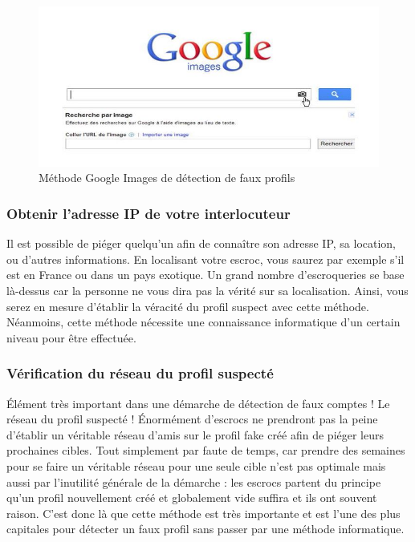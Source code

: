 \documentclass[12pt]{report}
\begin{document}
\begin{figure}[h]
\begin{center}
    \includegraphics[width=150mm]{google-image-recherche.jpg}
    \end{center}
    \caption{Méthode Google Images de détection de faux profils}
\label{fig:Méthode Google Images de détection de faux profils}
  \end{figure}

\subsubsection{Obtenir l’adresse IP de votre interlocuteur}
Il est possible de piéger quelqu'un afin de connaître son adresse IP, sa location, ou d'autres informations. En localisant votre escroc, vous saurez par exemple s’il est en France ou dans un pays exotique. Un grand nombre d'escroqueries se base là-dessus car la personne ne vous dira pas la vérité sur sa localisation. Ainsi, vous serez en mesure d'établir la véracité du profil suspect avec cette méthode. Néanmoins, cette méthode nécessite une connaissance informatique d'un certain niveau pour être effectuée. 

\subsubsection{Vérification du réseau du profil suspecté}
Élément très important dans une démarche de détection de faux comptes ! Le réseau du profil suspecté ! Énormément d'escrocs ne prendront pas la peine d'établir un véritable réseau d'amis sur le profil fake créé afin de piéger leurs prochaines cibles. Tout simplement par faute de temps, car prendre des semaines pour se faire un véritable réseau pour une seule cible n'est pas optimale mais aussi par l'inutilité générale de la démarche : les escrocs partent du principe qu'un profil nouvellement créé et globalement vide suffira et ils ont souvent raison. C'est donc là que cette méthode est très importante et est l'une des plus capitales pour détecter un faux profil sans passer par une méthode informatique.\\
\end{document}
